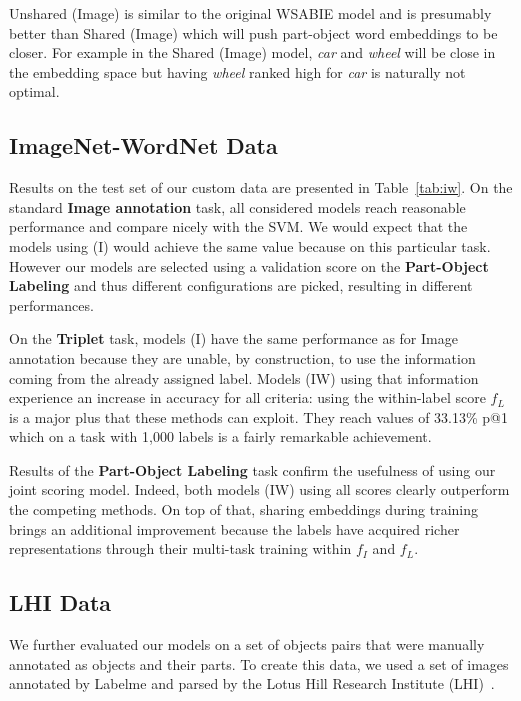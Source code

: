 Unshared (Image) is similar to the original WSABIE model
and is presumably better than Shared (Image) which will push part-object word
embeddings to be closer. For example in the Shared (Image) model, {\it car} and
{\it wheel} will be close in the embedding space but having {\it wheel} ranked high
for {\it car} is naturally not optimal.






\subsection{ImageNet-WordNet Data}

Results on the test set of our custom data are presented in Table~\ref{tab:iw}.
%
On the standard {\bf Image annotation} task, all considered models reach
reasonable performance and compare nicely with the SVM.  We would expect that
the models using (I)
would achieve the same value because on this particular task.
However our models are selected using a validation score on the {\bf
Part-Object Labeling} and thus different configurations are picked, resulting
in different performances.




On the {\bf Triplet} task, models (I) have the same performance as for 
{Image annotation} because they are unable, by construction, to use the information
coming from the already assigned label. Models (IW) using that
information experience an increase in accuracy for all criteria: using
the within-label score $f_L$ is a major plus that these methods can
exploit. They reach values of  33.13\% p@1 which on a
task with 1,000 labels is a fairly remarkable achievement.

Results of the {\bf Part-Object Labeling} task
confirm the usefulness of using our joint scoring model. Indeed, both
models (IW) using all scores clearly outperform the competing methods. 
On top of that, sharing embeddings during training brings an additional
improvement because the labels have acquired richer representations
through their multi-task training within $f_I$ and $f_L$.


\subsection{LHI Data}
We further evaluated our models on a set of objects pairs that were
manually annotated as objects and their parts. To create this data, we
used a set of images annotated by Labelme \citep{labelme} and parsed
by the Lotus Hill Research Institute (LHI)~\citep{yao2009image}. 

